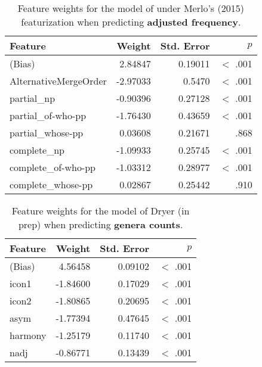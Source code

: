 \documentclass[11pt]{article}
\newcommand{\lt}{<}
\begin{document}
\begin{table}[ht!]
  \centering
  \begin{tabular}{|l|r|r|r|}
    \hline
    Feature & Weight & Std. Error & $p$ \\
    \hline
    (Bias)                    &  2.84847 &    0.19011 &  $\lt$ .001 \\
    AlternativeMergeOrder & -2.97033 &   0.5470 & $\lt$ .001 \\
    partial\_np                     &  -0.90396 &    0.27128 & $\lt$ .001 \\
    partial\_of-who-pp              &  -1.76430 &    0.43659 & $\lt$ .001  \\
    partial\_whose-pp                &  0.03608 &    0.21671 & .868 \\
    complete\_np                    &  -1.09933 &    0.25745 & $\lt$ .001 \\
    complete\_of-who-pp             &  -1.03312 &    0.28977 & $\lt$ .001 \\
    complete\_whose-pp               &  0.02867 &    0.25442 & .910 \\
    \hline
  \end{tabular}
  \caption{Feature weights for the model of \citet{cinque2005deriving} under Merlo's (2015) featurization when predicting \textbf{adjusted frequency}.}
\end{table}



\begin{table}[ht!]
  \centering
  \begin{tabular}{|l|r|r|r|}
    \hline
    Feature & Weight & Std. Error & $p$ \\
    \hline
    (Bias) & 4.56458 &    0.09102 &  $\lt$ .001 \\
    icon1      & -1.84600 &    0.17029 & $\lt$ .001 \\
    icon2      & -1.80865 &    0.20695 & $\lt$ .001 \\
    asym       & -1.77394 &    0.47645 & $\lt$ .001 \\
    harmony    & -1.25179 &    0.11740 & $\lt$ .001 \\
    nadj       & -0.86771 &    0.13439 & $\lt$ .001 \\
    \hline
  \end{tabular}
  \caption{Feature weights for the model of Dryer (in prep) when predicting \textbf{genera counts}.}
\end{table}
\end{document}
